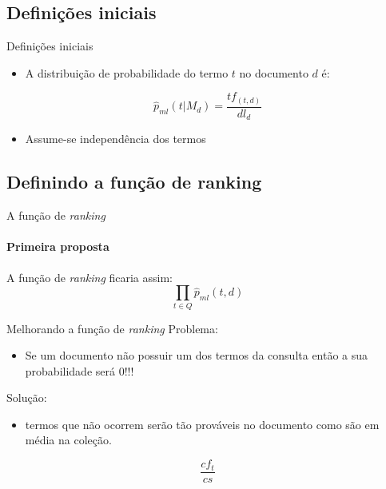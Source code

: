 \documentclass[compress]{beamer}
\begin{document}
\subsection{Definições iniciais}

    \begin{frame}{Definições iniciais}
            \begin{itemize}
            \item A distribuição de probabilidade do termo $t$ no documento $d$ é:
            \end{itemize}
            \[
            \hat{p}_{ml}(t|M_{d})=\frac{tf_{(t,d)}}{dl_{d}}\]


            \begin{itemize}
            \item Assume-se independência dos termos
            \end{itemize}
    \end{frame}

\subsection{Definindo a função de ranking}

    \begin{frame}{A função de \emph{ranking}}
    \framesubtitle{Primeira proposta}
            A função de \emph{ranking} ficaria assim:
            \[
            \prod_{t\in Q}\hat{p}_{ml}(t,d)\]
    \end{frame}



    \begin{frame}{Melhorando a função de \emph{ranking}}
            Problema:

            \begin{itemize}
                \item Se um documento não possuir um dos termos da consulta então a sua
            probabilidade será 0!!!
            \end{itemize}

            Solução: 

            \begin{itemize}
                \item termos que não ocorrem serão tão prováveis no documento como são em
            média na coleção.
            \end{itemize}
            \[
            \frac{cf_{t}}{cs}\]
    \end{frame}
\end{document}
